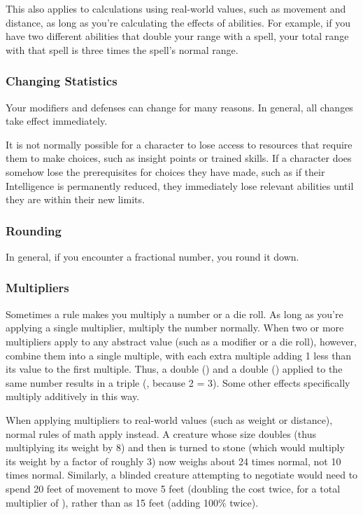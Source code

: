             This also applies to calculations using real-world values, such as movement and distance, as long as you're calculating the effects of abilities.
            For example, if you have two different abilities that double your range with a spell, your total range with that spell is three times the spell's normal range.

        \subsubsection{Changing Statistics}

            Your modifiers and defenses can change for many reasons.
            In general, all changes take effect immediately.

            It is not normally possible for a character to lose access to resources that require them to make choices, such as insight points or trained skills.
            If a character does somehow lose the prerequisites for choices they have made, such as if their Intelligence is permanently reduced, they immediately lose relevant abilities until they are within their new limits.

        \subsubsection{Rounding}
            In general, if you encounter a fractional number, you round it down.

        \subsubsection{Multipliers}
            Sometimes a rule makes you multiply a number or a die roll.
            As long as you're applying a single multiplier, multiply the number normally.
            When two or more multipliers apply to any abstract value (such as a modifier or a die roll), however, combine them into a single multiple, with each extra multiple adding 1 less than its value to the first multiple.
            Thus, a double () and a double () applied to the same number results in a triple (, because 2  = 3).
            Some other effects specifically multiply additively in this way.

            When applying multipliers to real-world values (such as weight or distance), normal rules of math apply instead.
            A creature whose size doubles (thus multiplying its weight by 8) and then is turned to stone (which would multiply its weight by a factor of roughly 3) now weighs about 24 times normal, not 10 times normal.
            Similarly, a blinded creature attempting to negotiate  would need to spend 20 feet of movement to move 5 feet (doubling the cost twice, for a total multiplier of ), rather than as 15 feet (adding 100\% twice).

